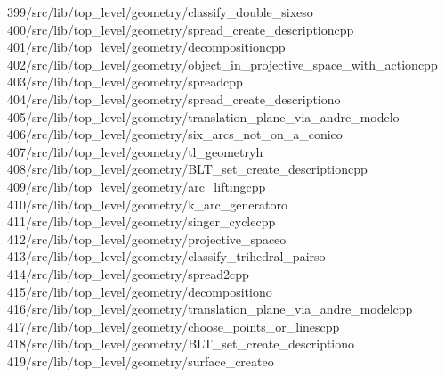 \begin{tabbing}
399\>/src/lib/top\_level/geometry/classify\_double\_sixeso\\[0pt]
400\>/src/lib/top\_level/geometry/spread\_create\_descriptioncpp\\[0pt]
401\>/src/lib/top\_level/geometry/decompositioncpp\\[0pt]
402\>/src/lib/top\_level/geometry/object\_in\_projective\_space\_with\_actioncpp\\[0pt]
403\>/src/lib/top\_level/geometry/spreadcpp\\[0pt]
404\>/src/lib/top\_level/geometry/spread\_create\_descriptiono\\[0pt]
405\>/src/lib/top\_level/geometry/translation\_plane\_via\_andre\_modelo\\[0pt]
406\>/src/lib/top\_level/geometry/six\_arcs\_not\_on\_a\_conico\\[0pt]
407\>/src/lib/top\_level/geometry/tl\_geometryh\\[0pt]
408\>/src/lib/top\_level/geometry/BLT\_set\_create\_descriptioncpp\\[0pt]
409\>/src/lib/top\_level/geometry/arc\_liftingcpp\\[0pt]
410\>/src/lib/top\_level/geometry/k\_arc\_generatoro\\[0pt]
411\>/src/lib/top\_level/geometry/singer\_cyclecpp\\[0pt]
412\>/src/lib/top\_level/geometry/projective\_spaceo\\[0pt]
413\>/src/lib/top\_level/geometry/classify\_trihedral\_pairso\\[0pt]
414\>/src/lib/top\_level/geometry/spread2cpp\\[0pt]
415\>/src/lib/top\_level/geometry/decompositiono\\[0pt]
416\>/src/lib/top\_level/geometry/translation\_plane\_via\_andre\_modelcpp\\[0pt]
417\>/src/lib/top\_level/geometry/choose\_points\_or\_linescpp\\[0pt]
418\>/src/lib/top\_level/geometry/BLT\_set\_create\_descriptiono\\[0pt]
419\>/src/lib/top\_level/geometry/surface\_createo\\[0pt]

\end{tabbing}
